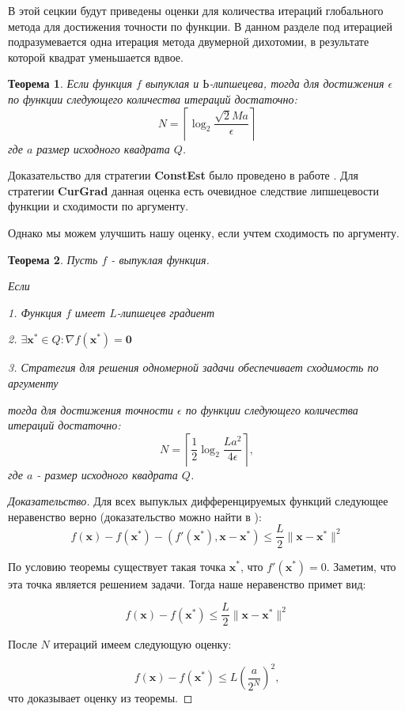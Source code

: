 \documentclass[12pt]{article}
\newtheorem{theorem}{Теорема}[section]
\begin{document}
В этой сецкии будут приведены оценки для количества итераций глобального метода для достижения точности по функции. В данном разделе под итерацией подразумевается одна итерация метода двумерной дихотомии, в результате которой квадрат уменьшается вдвое.

\begin{theorem}
Если функция $f$ выпуклая и $Ь$-липшецева, тогда для достижения $\epsilon$ по функции следующего количества итераций достаточно:
\begin{equation}\label{NI1}N = \left\lceil\log_2\frac{\sqrt{2}Ma}{\epsilon}\right\rceil\end{equation}
где $a$ размер исходного квадрата $Q$.
\end{theorem}

Доказательство для стратегии \textbf{ConstEst} было проведено в работе \cite{StonPas}. Для стратегии \textbf{CurGrad} данная оценка есть очевидное следствие липшецевости функции и сходимости по аргументу.

Однако мы можем улучшить нашу оценку, если учтем сходимость по аргументу.
\begin{theorem}
Пусть $f$ - выпуклая функция.

Если

1. Функция $f$ имеет $L$-липшецев градиент

2. $\exists \textbf{x}^*\in Q: \nabla f(\textbf{x}^*) = \textbf{0}$

3. Стратегия для решения одномерной задачи обеспечивает сходимость по аргументу

тогда для достижения точности $\epsilon$ по функции следующего количества итераций достаточно:
\begin{equation}\label{NI3}N = \left\lceil\frac{1}{2}\log_2\frac{La^2}{4\epsilon}\right\rceil,
\end{equation}
где $a$ - размер исходного квадрата $Q$.
\end{theorem}

\begin{proof}[Доказательство]
Для всех выпуклых дифференцируемых функций следующее неравенство верно (доказательство можно найти в \cite{Nesterov}):
$$f(\textbf{x}) - f(\textbf{x}^*) - (f'(\textbf{x}^*), \textbf{x} - \textbf{x}^*) \leq \frac{L}{2}\|\textbf{x}-\textbf{x}^*\|^2$$

По условию теоремы существует такая точка $\textbf{x}^*$, что $f'(\textbf{x}^*) = 0$. Заметим, что эта точка является решением задачи. Тогда наше неравенство примет вид:

$$f(\textbf{x}) - f(\textbf{x}^*)\leq \frac{L}{2}\|\textbf{x}-\textbf{x}^*\|^2$$

После $N$ итераций имеем следующую оценку:

$$f(\textbf{x}) - f(\textbf{x}^*)\leq L\left(\frac{a}{2^N}\right)^2,$$
что доказывает оценку из теоремы.
\end{proof}
\end{document}
